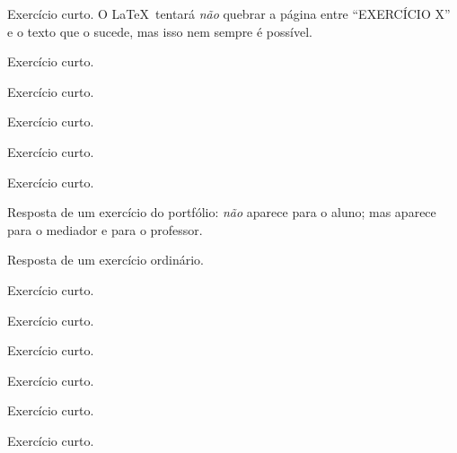 \documentclass[a4paper]{article}
\begin{document}
\begin{exercicio}
  \lipsum[1-20]
\end{exercicio}

\begin{exercicio}
  Exercício curto.
  O \LaTeX\ tentará \emph{não} quebrar a página entre ``EXERCÍCIO X'' e o texto que o sucede, mas isso nem sempre é possível.
\end{exercicio}

\begin{exercicio}
  Exercício curto.
\end{exercicio}

\begin{exercicio}
  Exercício curto.
\end{exercicio}

\begin{exercicio}
  Exercício curto.
\end{exercicio}

\begin{exercicio}
  Exercício curto.
\end{exercicio}

\begin{exercicio}
  Exercício curto.
\end{exercicio}

\begin{respostas}
  \begin{exercicio*}
    Resposta de um exercício do portfólio:
    \emph{não} aparece para o aluno;
    mas aparece para o mediador e para o professor.
  \end{exercicio*}
  
  \begin{exercicio}
    Resposta de um exercício ordinário.
  \end{exercicio}
  
  \begin{exercicio}
    \lipsum[1-18]
  \end{exercicio}
  
  \begin{exercicio}
    Exercício curto.
  \end{exercicio}

  \begin{exercicio}
    Exercício curto.
  \end{exercicio}

  \begin{exercicio}
    Exercício curto.
  \end{exercicio}

  \begin{exercicio}
    Exercício curto.
  \end{exercicio}

  \begin{exercicio}
    Exercício curto.
  \end{exercicio}

  \begin{exercicio}
    Exercício curto.
  \end{exercicio}
\end{respostas}
\end{document}
